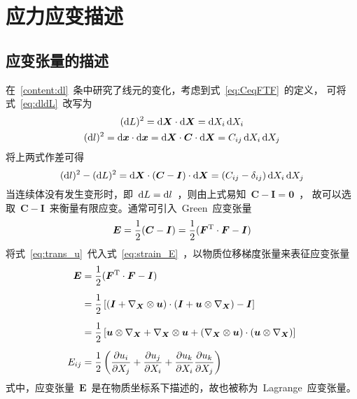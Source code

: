 \section{应力应变描述}
\subsection{应变张量的描述}\label{content:strain}
在~\ref{content:dl}~条中研究了线元的变化，考虑到式~\eqref{eq:CeqFTF}~的定义，
可将式~\eqref{eq:dldL}~改写为
\begin{subequations}
	\begin{gather}
	(\diff L)^2 = \diff \bm{X} \cdot \diff \bm{X} = \diff X_i \diff X_i  \\
	(\diff l)^2 = \diff \bm{x} \cdot \diff \bm{x} =\diff \bm{X} \cdot \bm{C} \cdot \diff \bm{X} = C_{ij} \diff X_i \diff X_j \label{eq:dl^2}
	\end{gather}
\end{subequations}
将上两式作差可得
\begin{equation}
	(\mathop{}\!\mathrm{d} l)^2-(\mathop{}\!\mathrm{d} L)^2=\mathop{}\!\mathrm{d} \bm{X} \cdot (\bm{C}-\bm{I}) \cdot \mathop{}\!\mathrm{d} \bm{X}=(C_{ij}-\delta_{ij}) \mathop{}\!\mathrm{d} X_i \mathop{}\!\mathrm{d} X_j
\end{equation}
当连续体没有发生变形时，即~$\mathop{}\!\mathrm{d} L =\mathop{}\!\mathrm{d} l$~，则由上式易知~$\bm{C}-\bm{I}=\bm{0}$~，
故可以选取~$\bm{C}-\bm{I}$~来衡量有限应变。通常可引入~Green~应变张量
\begin{equation}\label{eq:strain_E}
	\bm{E}=\frac{1}{2}(\bm{C}-\bm{I})=\frac{1}{2}(\bm{F}^{\mathrm{T}} \cdot \bm{F}-\bm{I})
\end{equation}
将式~\eqref{eq:trans_u}~代入式~\eqref{eq:strain_E}~，以物质位移梯度张量来表征应变张量
{\setlength\belowdisplayskip{5pt}
\begin{subequations}\label{eq:strain_E2}
	\begin{align}
	\bm{E}  & =\frac{1}{2}(\bm{F}^{\mathrm{T}} \cdot \bm{F}-\bm{I}) \notag \\[5pt]
			& =\frac{1}{2}\left[(\bm{I}+\nabla_{\bm{X}} \otimes \bm{u}) \cdot (\bm{I}+\bm{u} \otimes \nabla_{\bm{X}}) - \bm{I}\right] \\[5pt]
			& =\frac{1}{2}\left[\bm{u} \otimes \nabla_{\bm{X}} + \nabla_{\bm{X}} \otimes \bm{u} + (\nabla_{\bm{X}} \otimes \bm{u}) \cdot (\bm{u} \otimes \nabla_{\bm{X}}) \right] \notag \\[5pt]
	E_{ij}  & =\frac{1}{2} \left( \frac{\partial u_i}{\partial X_j} + \frac{\partial u_j}{\partial X_i} + \frac{\partial u_k}{\partial X_i} \frac{\partial u_k}{\partial X_j}\right) \label{eq:strain_E3}
	\end{align}
\end{subequations}}
式中，应变张量~$\bm{E}$~是在物质坐标系下描述的，故也被称为~Lagrange~应变张量。

